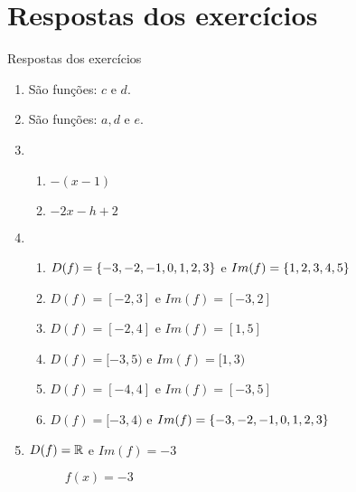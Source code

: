 \section{Respostas dos exercícios}

\begin{frame}[allowframebreaks]{Respostas dos exercícios}
    \begin{enumerate}
        \item São funções: $c$ e $d$.
        
        \item São funções: $a, d$ e $e$.
        
        \item 
        \begin{enumerate}[a]
            \item $-(x-1)$
            \item $-2x-h+2$
        \end{enumerate}

        \item 
        \begin{enumerate}[a]
            \item $D(f) = \left\{ -3, -2, -1, 0, 1, 2, 3 \right\}$ e $Im(f) = \left\{ 1, 2, 3, 4, 5 \right\}$
            \item $D(f) = [-2, 3]$ e $Im(f) = [-3, 2]$
            \item $D(f) = [-2, 4]$ e $Im(f) = [1, 5]$
            \item $D(f) = [-3, 5)$ e $Im(f) = [1, 3)$
            \item $D(f) = [-4, 4]$ e $Im(f) = [-3, 5]$
            \item $D(f) = [-3, 4)$ e $Im(f) = \left\{ -3, -2, -1, 0, 1, 2, 3 \right\}$
        \end{enumerate}

        \vspace{1cm}

        \item $D(f) = \mathbb{R}$ e $Im(f) = {-3}$

        \begin{figure}
        \centering
        \caption{$f(x) = -3$}
        \end{figure}


\end{enumerate}
\end{frame}
